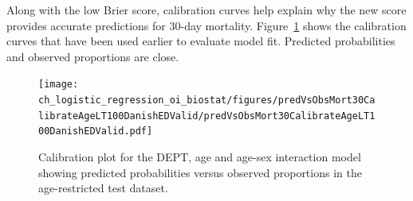 Along with the low Brier score, calibration curves help explain why the new score provides accurate predictions for 30-day mortality.  Figure~\ref{figure:predVsObsMort30CalibrateAgeLT100DanishEDValid} shows the calibration curves that have been used earlier to evaluate model fit.  Predicted probabilities and observed proportions are close.

\begin{figure}[!tbh]
  \centering
  \texttt{[image: ch\_logistic\_regression\_oi\_biostat/figures/predVsObsMort30CalibrateAgeLT100DanishEDValid/predVsObsMort30CalibrateAgeLT100DanishEDValid.pdf]} 
    \caption{Calibration plot for the DEPT, age and age-sex interaction model showing predicted probabilities versus observed proportions in the age-restricted test dataset.}
    \label{figure:predVsObsMort30CalibrateAgeLT100DanishEDValid}
\end{figure}

